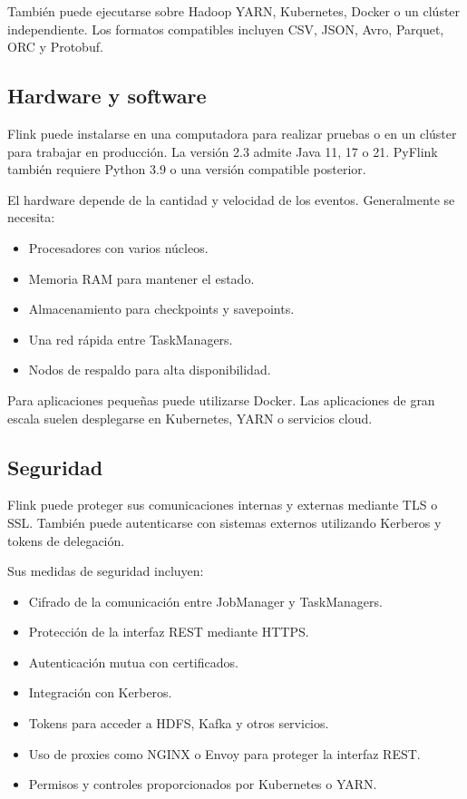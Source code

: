También puede ejecutarse sobre Hadoop YARN, Kubernetes, Docker o un clúster
independiente. Los formatos compatibles incluyen CSV, JSON, Avro, Parquet,
ORC y Protobuf.

\subsection{Hardware y software}

Flink puede instalarse en una computadora para realizar pruebas o en un
clúster para trabajar en producción. La versión 2.3 admite Java 11, 17 o 21.
PyFlink también requiere Python 3.9 o una versión compatible posterior.

El hardware depende de la cantidad y velocidad de los eventos. Generalmente
se necesita:

\begin{itemize}
    \item Procesadores con varios núcleos.
    \item Memoria RAM para mantener el estado.
    \item Almacenamiento para checkpoints y savepoints.
    \item Una red rápida entre TaskManagers.
    \item Nodos de respaldo para alta disponibilidad.
\end{itemize}

Para aplicaciones pequeñas puede utilizarse Docker. Las aplicaciones de gran
escala suelen desplegarse en Kubernetes, YARN o servicios cloud.

\subsection{Seguridad}

Flink puede proteger sus comunicaciones internas y externas mediante TLS o
SSL. También puede autenticarse con sistemas externos utilizando Kerberos y
tokens de delegación.

Sus medidas de seguridad incluyen:

\begin{itemize}
    \item Cifrado de la comunicación entre JobManager y TaskManagers.
    \item Protección de la interfaz REST mediante HTTPS.
    \item Autenticación mutua con certificados.
    \item Integración con Kerberos.
    \item Tokens para acceder a HDFS, Kafka y otros servicios.
    \item Uso de proxies como NGINX o Envoy para proteger la interfaz REST.
    \item Permisos y controles proporcionados por Kubernetes o YARN.
\end{itemize}

